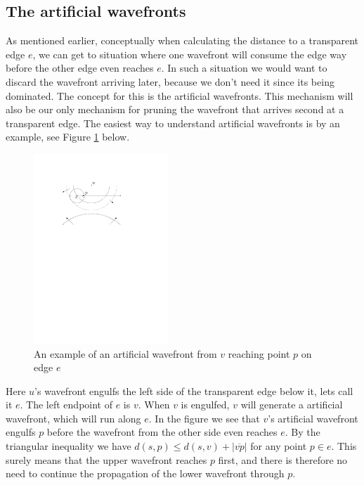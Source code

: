 \subsection{The artificial wavefronts}

As mentioned earlier, conceptually when calculating the distance to a transparent edge $e$, we 
can get to situation where one wavefront will consume the edge way before the other edge even 
reaches $e$. In such a situation we would want to discard the wavefront arriving later, 
because we don't need it since its being dominated. The concept for this is the artificial wavefronts. 
This mechanism will also be our only mechanism for pruning the wavefront that arrives second at a 
transparent edge. The easiest way to understand artificial wavefronts is by an example, see Figure 
\ref{fig:artificialwavefront} below.

\begin{figure}[H]
	\centering
	\includegraphics[width=0.45\textwidth]{figures/artificialwavefront.pdf}
	\caption{An example of an artificial wavefront from $v$ reaching point $p$ on edge $e$\cite{HershbergerS99}}
	\label{fig:artificialwavefront}
\end{figure}

Here $u$'s wavefront engulfs the left side of the transparent edge below it, lets call it $e$. 
The left endpoint of $e$ is $v$. When $v$ is engulfed, $v$ will generate a artificial wavefront, 
which will run along $e$. In the figure we see that $v$'s artificial wavefront engulfs $p$ 
before the wavefront from the other side even reaches $e$. By the triangular inequality we 
have $d(s,p) \leq d(s,v) + |\overline{vp}|$ for any point $p \in e$. This surely means that 
the upper wavefront reaches $p$ first, and there is therefore no need to continue the 
propagation of the lower wavefront through $p$.

